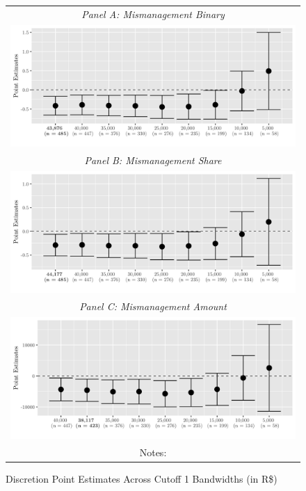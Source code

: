 \documentclass[11pt]{article}
\begin{document}
\begin{figure}[!htbp]
  \caption{\label{fig:bandwidths} Discretion Point Estimates Across Cutoff 1 Bandwidths (in R\$)}
  \centering
  \small
  \begin{tabular}{c}
  \emph{Panel A: Mismanagement Binary} \\
  \includegraphics[scale = .2]{mismanagementplot1} \\
  \emph{Panel B: Mismanagement Share} \\
  \includegraphics[scale = .2]{mismanagementplot2} \\
  \emph{Panel C: Mismanagement Amount} \\
  \includegraphics[scale = .2]{mismanagementplot3} \\
  Notes:
  \end{tabular}
\end{figure}
\end{document}
